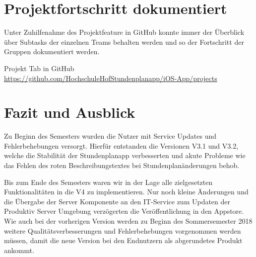 \section{Projektfortschritt dokumentiert}
Unter Zuhilfenahme des Projektfeature in GitHub konnte immer der Überblick über Subtasks der einzelnen Teams behalten werden und so der Fortschritt der Gruppen dokumentiert werden.

Projekt Tab in GitHub\\
\url{https://github.com/HochschuleHofStundenplanapp/iOS-App/projects}






\section{Fazit und Ausblick}
Zu Beginn des Semesters wurden die Nutzer  mit Service Updates und Fehlerbehebungen versorgt. Hierfür entstanden die Versionen V3.1 und V3.2, welche die Stabilität der Stundenplanapp verbesserten und akute Probleme wie das Fehlen des roten Beschreibungstextes bei Stundenplanänderungen behob.

Bis zum Ende des Semesters waren wir in der Lage alle zielgesetzten Funktionalitäten in die V4 zu implementieren. Nur noch kleine Änderungen und die Übergabe der Server Komponente an den IT-Service zum Updaten der Produktiv Server Umgebung verzögerten die Veröffentlichung in den Appstore.
Wie auch bei der vorherigen Version werden zu Beginn des Sommersemester 2018 weitere Qualitätsverbesserungen und Fehlerbehebungen vorgenommen  werden müssen, damit die neue Version bei den Endnutzern als abgerundetes Produkt ankommt.